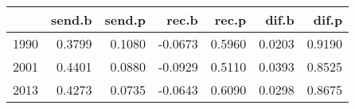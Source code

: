 \begin{table}[ht]
\centering
\begin{tabular}{rrrrrrr}
  \hline
 & send.b & send.p & rec.b & rec.p & dif.b & dif.p \\ 
  \hline
1990 & 0.3799 & 0.1080 & -0.0673 & 0.5960 & 0.0203 & 0.9190 \\ 
  2001 & 0.4401 & 0.0880 & -0.0929 & 0.5110 & 0.0393 & 0.8525 \\ 
  2013 & 0.4273 & 0.0735 & -0.0643 & 0.6090 & 0.0298 & 0.8675 \\ 
   \hline
\end{tabular}
\end{table}
